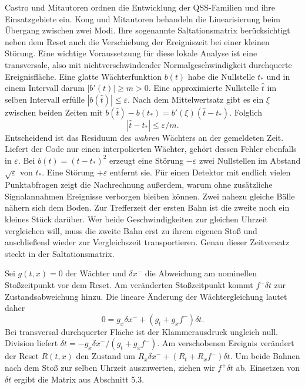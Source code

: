 
Castro und Mitautoren ordnen die Entwicklung der QSS-Familien und ihre Einsatzgebiete ein. Kong und Mitautoren behandeln die Linearisierung beim Übergang zwischen zwei Modi. Ihre sogenannte Saltationsmatrix berücksichtigt neben dem Reset auch die Verschiebung der Ereigniszeit bei einer kleinen Störung. Eine wichtige Voraussetzung für diese lokale Analyse ist eine transversale, also mit nichtverschwindender Normalgeschwindigkeit durchquerte Ereignisfläche.
Eine glatte Wächterfunktion \(b(t)\) habe die Nullstelle \(t_*\) und in einem Intervall darum \(|b'(t)|\ge m>0\). Eine approximierte Nullstelle \(\hat t\) im selben Intervall erfülle \(|b(\hat t)|\le\varepsilon\). Nach dem Mittelwertsatz gibt es ein \(\xi\) zwischen beiden Zeiten mit \(b(\hat t)-b(t_*)=b'(\xi)(\hat t-t_*)\). Folglich
\[
 |\hat t-t_*|\le\varepsilon/m .
\]
Entscheidend ist das Residuum des \emph{wahren} Wächters an der gemeldeten Zeit. Liefert der Code nur einen interpolierten Wächter, gehört dessen Fehler ebenfalls in \(\varepsilon\).
Bei \(b(t)=(t-t_*)^2\) erzeugt eine Störung \(-\varepsilon\) zwei Nullstellen im Abstand \(\sqrt{\varepsilon}\) von \(t_*\). Eine Störung \(+\varepsilon\) entfernt sie. Für einen Detektor mit endlich vielen Punktabfragen zeigt die Nachrechnung außerdem, warum ohne zusätzliche Signalannahmen Ereignisse verborgen bleiben können.
Zwei nahezu gleiche Bälle nähern sich dem Boden. Zur Trefferzeit der ersten Bahn ist die zweite noch ein kleines Stück darüber. Wer beide Geschwindigkeiten zur gleichen Uhrzeit vergleichen will, muss die zweite Bahn erst zu ihrem eigenen Stoß und anschließend wieder zur Vergleichszeit transportieren. Genau dieser Zeitversatz steckt in der Saltationsmatrix.

Sei \(g(t,x)=0\) der Wächter und \(\delta x^-\) die Abweichung am nominellen Stoßzeitpunkt vor dem Reset. Am veränderten Stoßzeitpunkt kommt \(f^-\delta t\) zur Zustandsabweichung hinzu. Die lineare Änderung der Wächtergleichung lautet daher
\[
 0=g_x\delta x^-+(g_t+g_xf^-)\delta t.
\]
Bei transversal durchquerter Fläche ist der Klammerausdruck ungleich null. Division liefert \(\delta t=-g_x\delta x^-/(g_t+g_xf^-)\). Am verschobenen Ereignis verändert der Reset \(R(t,x)\) den Zustand um \(R_x\delta x^-+(R_t+R_xf^-)\delta t\). Um beide Bahnen nach dem Stoß zur selben Uhrzeit auszuwerten, ziehen wir \(f^+\delta t\) ab. Einsetzen von \(\delta t\) ergibt die Matrix aus Abschnitt 5.3.

